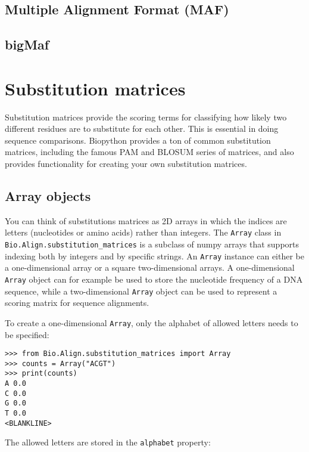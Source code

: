\subsection{Multiple Alignment Format (MAF)}
\label{subsec:align_maf}

\subsection{bigMaf}
\label{subsec:align_bigmaf}

\section{Substitution matrices}
\label{sec:substitution_matrices}

Substitution matrices \cite{durbin1998} provide the scoring terms for classifying how likely two different residues are to substitute for each other. This is essential in doing sequence comparisons.  Biopython provides a ton of common substitution matrices, including the famous PAM and BLOSUM series of matrices, and also provides functionality for creating your own substitution matrices.

\subsection{Array objects}

You can think of substitutions matrices as 2D arrays in which the indices are letters (nucleotides or amino acids) rather than integers.  The \verb+Array+ class in \verb+Bio.Align.substitution_matrices+ is a subclass of numpy arrays that supports indexing both by integers and by specific strings. An \verb+Array+ instance can either be a one-dimensional array or a square two-dimensional arrays. A one-dimensional \verb+Array+ object can for example be used to store the nucleotide frequency of a DNA sequence, while a two-dimensional \verb+Array+ object can be used to represent a scoring matrix for sequence alignments.

To create a one-dimensional \verb+Array+, only the alphabet of allowed letters needs to be specified:

\begin{verbatim}
>>> from Bio.Align.substitution_matrices import Array
>>> counts = Array("ACGT")
>>> print(counts)
A 0.0
C 0.0
G 0.0
T 0.0
<BLANKLINE>
\end{verbatim}
The allowed letters are stored in the \verb+alphabet+ property:

